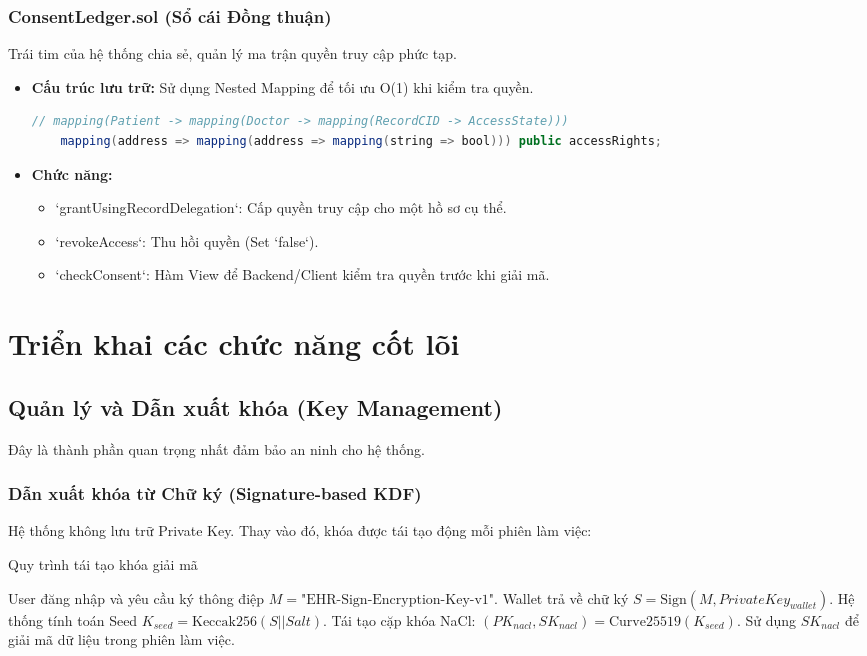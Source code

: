 \documentclass[12pt,a4paper]{report}
\begin{document}
\subsection{ConsentLedger.sol (Sổ cái Đồng thuận)}
Trái tim của hệ thống chia sẻ, quản lý ma trận quyền truy cập phức tạp.
\begin{itemize}
    \item \textbf{Cấu trúc lưu trữ:} Sử dụng Nested Mapping để tối ưu O(1) khi kiểm tra quyền.
    \begin{lstlisting}[language=Java]
    // mapping(Patient -> mapping(Doctor -> mapping(RecordCID -> AccessState)))
    mapping(address => mapping(address => mapping(string => bool))) public accessRights;
    \end{lstlisting}
    \item \textbf{Chức năng:}
    \begin{itemize}
        \item `grantUsingRecordDelegation`: Cấp quyền truy cập cho một hồ sơ cụ thể.
        \item `revokeAccess`: Thu hồi quyền (Set `false`).
        \item `checkConsent`: Hàm View để Backend/Client kiểm tra quyền trước khi giải mã.
    \end{itemize}
\end{itemize}

\chapter{Triển khai các chức năng cốt lõi}\label{chuong-4}

\section{Quản lý và Dẫn xuất khóa (Key Management)}
Đây là thành phần quan trọng nhất đảm bảo an ninh cho hệ thống.

\subsection{Dẫn xuất khóa từ Chữ ký (Signature-based KDF)}
Hệ thống không lưu trữ Private Key. Thay vào đó, khóa được tái tạo động mỗi phiên làm việc:
\begin{algorithm}
\caption{Quy trình tái tạo khóa giải mã}
\begin{algorithmic}[1]
\State User đăng nhập và yêu cầu ký thông điệp $M = \text{"EHR-Sign-Encryption-Key-v1"}$.
\State Wallet trả về chữ ký $S = \text{Sign}(M, PrivateKey_{wallet})$.
\State Hệ thống tính toán Seed $K_{seed} = \text{Keccak256}(S || Salt)$.
\State Tái tạo cặp khóa NaCl: $(PK_{nacl}, SK_{nacl}) = \text{Curve25519}(K_{seed})$.
\State Sử dụng $SK_{nacl}$ để giải mã dữ liệu trong phiên làm việc.
\end{algorithmic}
\end{algorithm}
\end{document}
